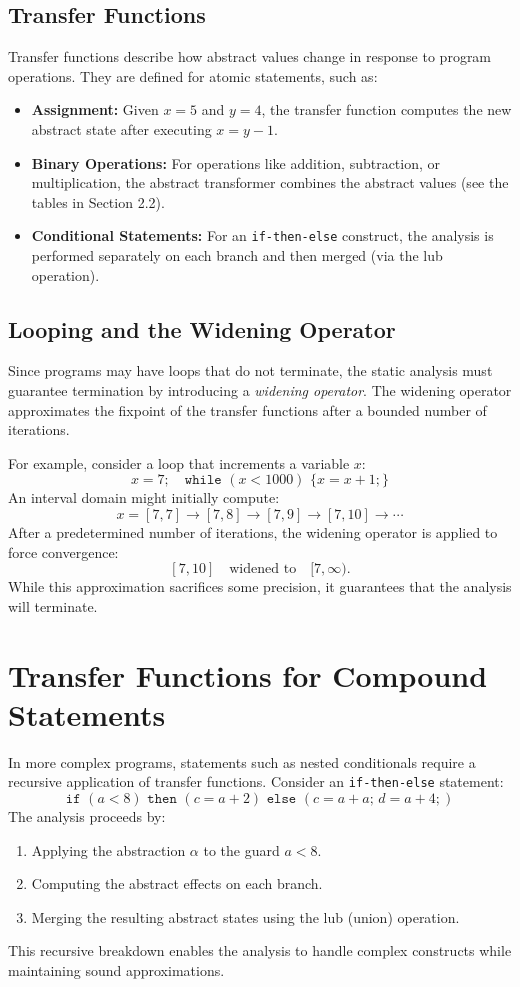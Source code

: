 \documentclass[oneside,11pt,dvipsnames]{book}
\begin{document}
\subsection{Transfer Functions}

Transfer functions describe how abstract values change in response to program operations. They are defined for atomic statements, such as:
\begin{itemize}
    \item \textbf{Assignment:} Given \(x = 5\) and \(y = 4\), the transfer function computes the new abstract state after executing \(x = y - 1\).
    \item \textbf{Binary Operations:} For operations like addition, subtraction, or multiplication, the abstract transformer combines the abstract values (see the tables in Section 2.2).
    \item \textbf{Conditional Statements:} For an \texttt{if-then-else} construct, the analysis is performed separately on each branch and then merged (via the lub operation).
\end{itemize}

\subsection{Looping and the Widening Operator}

Since programs may have loops that do not terminate, the static analysis must guarantee termination by introducing a \emph{widening operator}. The widening operator approximates the fixpoint of the transfer functions after a bounded number of iterations.

For example, consider a loop that increments a variable \(x\):
\[
x = 7; \quad \texttt{while } (x < 1000) \,\, \{ x = x + 1; \}
\]
An interval domain might initially compute:
\[
x = [7,7] \to [7,8] \to [7,9] \to [7,10] \to \cdots
\]
After a predetermined number of iterations, the widening operator is applied to force convergence:
\[
[7,10] \quad \text{widened to} \quad [7, \infty).
\]
While this approximation sacrifices some precision, it guarantees that the analysis will terminate.

\section{Transfer Functions for Compound Statements}

In more complex programs, statements such as nested conditionals require a recursive application of transfer functions. Consider an \texttt{if-then-else} statement:
\[
\texttt{if } (a < 8) \texttt{ then } (c = a + 2) \texttt{ else } (c = a + a; \, d = a + 4;)
\]
The analysis proceeds by:
\begin{enumerate}
    \item Applying the abstraction \(\alpha\) to the guard \(a < 8\).
    \item Computing the abstract effects on each branch.
    \item Merging the resulting abstract states using the lub (union) operation.
\end{enumerate}
This recursive breakdown enables the analysis to handle complex constructs while maintaining sound approximations.
\end{document}
